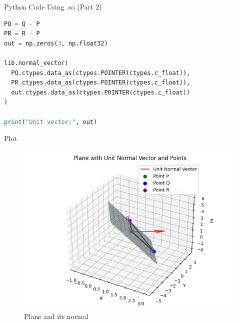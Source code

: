 \documentclass{beamer}
\begin{document}
\begin{frame}[fragile]{Python Code Using .so (Part 2)}
\begin{lstlisting}[language=Python]
PQ = Q - P
PR = R - P
out = np.zeros(3, np.float32)

lib.normal_vector(
  PQ.ctypes.data_as(ctypes.POINTER(ctypes.c_float)),
  PR.ctypes.data_as(ctypes.POINTER(ctypes.c_float)),
  out.ctypes.data_as(ctypes.POINTER(ctypes.c_float))
)

print("Unit vector:", out)
\end{lstlisting}
\end{frame}



\begin{frame}{Plot}
\begin{figure}[H]
    \centering
    \includegraphics[width=0.78\linewidth]{Figs/fig1.png}
    \caption{Plane and its normal}
    \label{fig:fig1}
\end{figure}

    
\end{frame}
\end{document}
